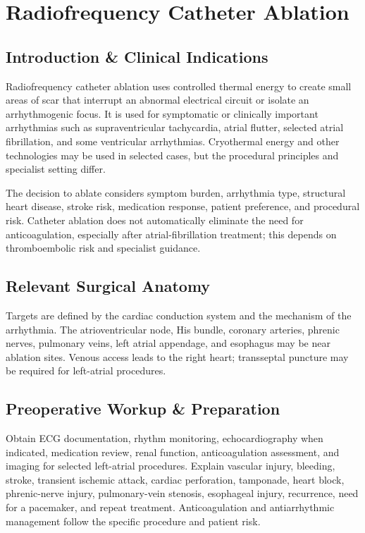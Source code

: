 \chapter{Radiofrequency Catheter Ablation}

\section*{Introduction \& Clinical Indications}
Radiofrequency catheter ablation uses controlled thermal energy to create small areas of scar that interrupt an abnormal electrical circuit or isolate an arrhythmogenic focus. It is used for symptomatic or clinically important arrhythmias such as supraventricular tachycardia, atrial flutter, selected atrial fibrillation, and some ventricular arrhythmias. Cryothermal energy and other technologies may be used in selected cases, but the procedural principles and specialist setting differ.

The decision to ablate considers symptom burden, arrhythmia type, structural heart disease, stroke risk, medication response, patient preference, and procedural risk. Catheter ablation does not automatically eliminate the need for anticoagulation, especially after atrial-fibrillation treatment; this depends on thromboembolic risk and specialist guidance.

\section*{Relevant Surgical Anatomy}
Targets are defined by the cardiac conduction system and the mechanism of the arrhythmia. The atrioventricular node, His bundle, coronary arteries, phrenic nerves, pulmonary veins, left atrial appendage, and esophagus may be near ablation sites. Venous access leads to the right heart; transseptal puncture may be required for left-atrial procedures.

\section*{Preoperative Workup \& Preparation}
Obtain ECG documentation, rhythm monitoring, echocardiography when indicated, medication review, renal function, anticoagulation assessment, and imaging for selected left-atrial procedures. Explain vascular injury, bleeding, stroke, transient ischemic attack, cardiac perforation, tamponade, heart block, phrenic-nerve injury, pulmonary-vein stenosis, esophageal injury, recurrence, need for a pacemaker, and repeat treatment. Anticoagulation and antiarrhythmic management follow the specific procedure and patient risk.


